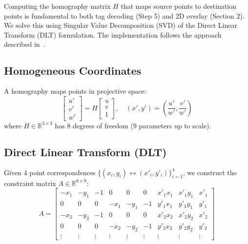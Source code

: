 \documentclass[9pt,a4paper,twocolumn,twoside]{tau-class/tau}
\begin{document}
    Computing the homography matrix $H$ that maps source points to destination points is fundamental to both tag decoding (Step 5) and 2D overlay (Section 2). We solve this using Singular Value Decomposition (SVD) of the Direct Linear Transform (DLT) formulation. The implementation follows the approach described in~\cite{rastogi_artag}.

    \subsection{Homogeneous Coordinates}

    A homography maps points in projective space:
    \begin{equation}
        \begin{bmatrix} u' \\ v' \\ w' \end{bmatrix} = H \begin{bmatrix} u \\ v \\ 1 \end{bmatrix}, \quad (x', y') = \left(\frac{u'}{w'}, \frac{v'}{w'}\right)
    \end{equation}
    where $H \in \mathbb{R}^{3 \times 3}$ has 8 degrees of freedom (9 parameters up to scale).

    \subsection{Direct Linear Transform (DLT)}

    Given 4 point correspondences $\{(x_i, y_i) \leftrightarrow (x'_i, y'_i)\}_{i=1}^4$, we construct the constraint matrix $A \in \mathbb{R}^{8 \times 9}$:
    \begin{equation}
        A = \begin{bmatrix}
            -x_1 & -y_1 & -1 & 0 & 0 & 0 & x'_1 x_1 & x'_1 y_1 & x'_1 \\
            0 & 0 & 0 & -x_1 & -y_1 & -1 & y'_1 x_1 & y'_1 y_1 & y'_1 \\
            -x_2 & -y_2 & -1 & 0 & 0 & 0 & x'_2 x_2 & x'_2 y_2 & x'_2 \\
            0 & 0 & 0 & -x_2 & -y_2 & -1 & y'_2 x_2 & y'_2 y_2 & y'_2 \\
            \vdots & \vdots & \vdots & \vdots & \vdots & \vdots & \vdots & \vdots & \vdots
        \end{bmatrix}
    \end{equation}
\end{document}
